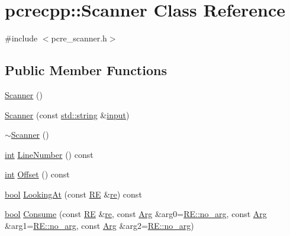 \hypertarget{classpcrecpp_1_1Scanner}{}\section{pcrecpp\+:\+:Scanner Class Reference}
\label{classpcrecpp_1_1Scanner}


{\ttfamily \#include $<$pcre\+\_\+scanner.\+h$>$}

\subsection*{Public Member Functions}
\begin{DoxyCompactItemize}
\item 
\hyperlink{classpcrecpp_1_1Scanner_a3fb971cbd141cad918e3b97919f5dffa}{Scanner} ()
\item 
\hyperlink{classpcrecpp_1_1Scanner_a81008708af9af6e52a18705b8f6fe955}{Scanner} (const \hyperlink{pcre_8txt_ad52baeed02a03dda73cbe504945c9c35}{std\+::string} \&\hyperlink{perltest_8txt_a1d3f4df61ab6d72e9cfd2de361e2a85b}{input})
\item 
\hyperlink{classpcrecpp_1_1Scanner_a12eaca6c699035968de21e780a62426a}{$\sim$\+Scanner} ()
\item 
\hyperlink{pcre_8txt_a42dfa4ff673c82d8efe7144098fbc198}{int} \hyperlink{classpcrecpp_1_1Scanner_aaf7f2c27250621bbfde30ed699b0b8db}{Line\+Number} () const 
\item 
\hyperlink{pcre_8txt_a42dfa4ff673c82d8efe7144098fbc198}{int} \hyperlink{classpcrecpp_1_1Scanner_a66ad0a399a73f1178901d75ea663f8f2}{Offset} () const 
\item 
\hyperlink{aplibtool_8c_ad5c9d4ba3dc37783a528b0925dc981a0}{bool} \hyperlink{classpcrecpp_1_1Scanner_a7b3bd079d2c2a66707eac2e4bcae0e75}{Looking\+At} (const \hyperlink{classpcrecpp_1_1RE}{RE} \&\hyperlink{pcre_8txt_abd134207f74532a8b094676c4a2ca9ed}{re}) const 
\item 
\hyperlink{aplibtool_8c_ad5c9d4ba3dc37783a528b0925dc981a0}{bool} \hyperlink{classpcrecpp_1_1Scanner_a4dc62197b816b30cfd9a4bbc0994a8c6}{Consume} (const \hyperlink{classpcrecpp_1_1RE}{RE} \&\hyperlink{pcre_8txt_abd134207f74532a8b094676c4a2ca9ed}{re}, const \hyperlink{classpcrecpp_1_1Arg}{Arg} \&arg0=\hyperlink{classpcrecpp_1_1RE_a596c7c964ad0e41415540e12ee73d302}{R\+E\+::no\+\_\+arg}, const \hyperlink{classpcrecpp_1_1Arg}{Arg} \&arg1=\hyperlink{classpcrecpp_1_1RE_a596c7c964ad0e41415540e12ee73d302}{R\+E\+::no\+\_\+arg}, const \hyperlink{classpcrecpp_1_1Arg}{Arg} \&arg2=\hyperlink{classpcrecpp_1_1RE_a596c7c964ad0e41415540e12ee73d302}{R\+E\+::no\+\_\+arg})

\end{DoxyCompactItemize}
